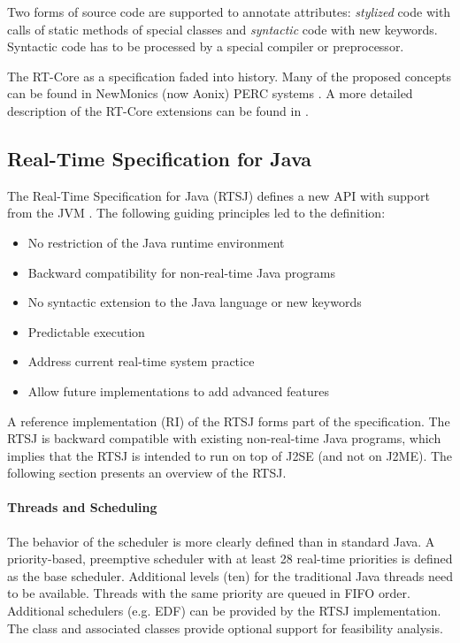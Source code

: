 Two forms of source code are supported to annotate attributes:
\textit{stylized} code with calls of static methods of special
classes and \textit{syntactic} code with new keywords. Syntactic
code has to be processed by a special compiler or preprocessor.

The RT-Core as a specification faded into history. Many of the
proposed concepts can be found in NewMonics (now Aonix) PERC systems
\cite{PERC}. A more detailed description of the RT-Core extensions
can be found in \cite{jop:rtjava}.

\subsection{Real-Time Specification for Java}
\label{sec:rtsj}

The Real-Time Specification for Java (RTSJ) defines a new API with
support from the JVM \cite{rtsj}. The following guiding principles
led to the definition:
%
\begin{itemize}
    \item No restriction of the Java runtime environment
    \item Backward compatibility for non-real-time Java programs
    \item No syntactic extension to the Java
language or new keywords
    \item Predictable execution
    \item Address current real-time system practice
    \item Allow future implementations to add advanced features
\end{itemize}
%
A reference implementation (RI) of the RTSJ forms part of the
specification. The RTSJ is backward compatible with existing
non-real-time Java programs, which implies that the RTSJ is intended
to run on top of J2SE (and not on J2ME). The following section
presents an overview of the RTSJ.

\paragraph{Threads and Scheduling}

The behavior of the scheduler is more clearly defined than in
standard Java. A priority-based, preemptive scheduler with at least
28 real-time priorities is defined as the base scheduler. Additional
levels (ten) for the traditional Java threads need to be available.
Threads with the same priority are queued in FIFO order. Additional
schedulers (e.g. EDF) can be provided by the RTSJ implementation. The
class  and associated classes provide optional
support for feasibility analysis.


